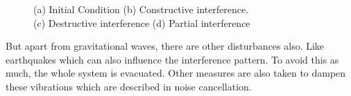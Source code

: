 \begin{figure}[h]
    \centering
    \qquad
    \qquad
    \qquad
    \caption{(a) Initial Condition (b) Constructive interference.\\
    (c) Destructive interference (d) Partial interference}
\end{figure}

But apart from gravitational waves, there are other disturbances also. Like earthquakes which can also influence the interference pattern. To avoid this as much, the whole system is evacuated. Other measures are also taken to dampen these vibrations which are described in noise cancellation.


